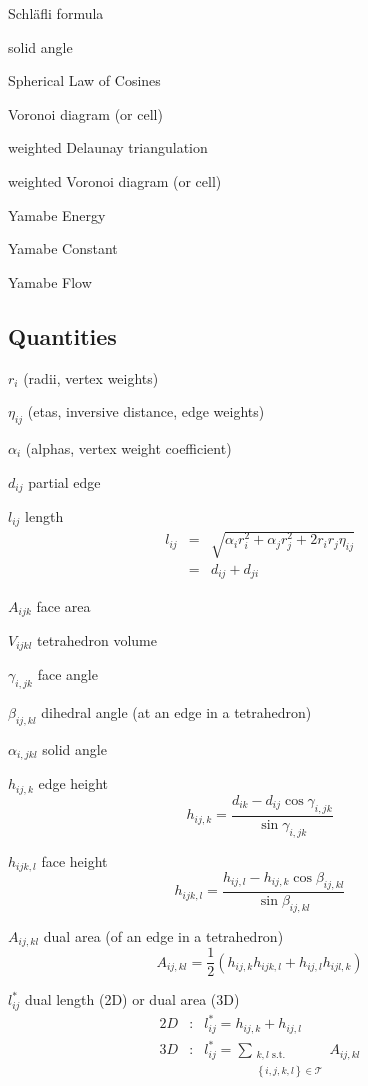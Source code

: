 \documentclass{article}
\begin{document}
Schl\"{a}fli formula

solid angle

Spherical Law of Cosines

Voronoi diagram (or cell)

weighted Delaunay triangulation

weighted Voronoi diagram (or cell)

Yamabe Energy

Yamabe Constant

Yamabe Flow

\bigskip 

\subsection{Quantities}

$r_{i}$ (radii, vertex weights)

$\eta _{ij}$ (etas, inversive distance, edge weights)

$\alpha _{i}$ (alphas, vertex weight coefficient)

$d_{ij}$ partial edge

$l_{ij}$ length%
\begin{eqnarray*}
l_{ij} &=&\sqrt{\alpha _{i}r_{i}^{2}+\alpha _{j}r_{j}^{2}+2r_{i}r_{j}\eta
_{ij}} \\
&=&d_{ij}+d_{ji}
\end{eqnarray*}

$A_{ijk}$ face area

$V_{ijkl}$ tetrahedron volume

$\gamma _{i,jk}$ face angle

$\beta _{ij,kl}$ dihedral angle (at an edge in a tetrahedron)

$\alpha _{i,jkl}$ solid angle

$h_{ij,k}$ edge height%
\[
h_{ij,k}=\frac{d_{ik}-d_{ij}\cos \gamma _{i,jk}}{\sin \gamma _{i,jk}}
\]

$h_{ijk,l}$ face height%
\[
h_{ijk,l}=\frac{h_{ij,l}-h_{ij,k}\cos \beta _{ij,kl}}{\sin \beta _{ij,kl}}
\]

$A_{ij,kl}$ dual area (of an edge in a tetrahedron)%
\[
A_{ij,kl}=\frac{1}{2}\left( h_{ij,k}h_{ijk,l}+h_{ij,l}h_{ijl,k}\right) 
\]

$l_{ij}^{\ast }$ dual length (2D) or dual area (3D) 
\begin{eqnarray*}
2D &:&l_{ij}^{\ast }=h_{ij,k}+h_{ij,l} \\
3D &:&l_{ij}^{\ast }=\sum_{\substack{ k,l\text{ s.t.} \\ \left\{
i,j,k,l\right\} \in \mathcal{T}}}A_{ij,kl}
\end{eqnarray*}
\end{document}
